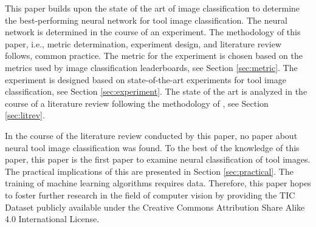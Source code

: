 This paper builds upon the state of the art of image classification to determine the best-performing neural network for tool image classification. The neural network is determined in the course of an experiment. The methodology of this paper, i.e., metric determination, experiment design, and literature review follows, common practice. The metric for the experiment is chosen based on the metrics used by image classification leaderboards, see Section \ref{sec:metric}. The experiment is designed based on state-of-the-art experiments for tool image classification, see Section \ref{sec:experiment}. The state of the art is analyzed in the course of a literature review following the methodology of \cite{Webster.2002}, see Section \ref{sec:litrev}. 
\par
In the course of the literature review conducted by this paper, no paper about neural tool image classification was found. To the best of the knowledge of this paper, this paper is the first paper to examine neural classification of tool images. The practical implications of this are presented in Section \ref{sec:practical}.
The training of machine learning algorithms requires data. \autocites{Pan.2010}{Szegedy.2014}{ElAmir.2020} Therefore, this paper hopes to foster further research in the field of computer vision by providing the \ac{TIC Dataset} publicly available under the Creative Commons Attribution Share Alike 4.0 International License.